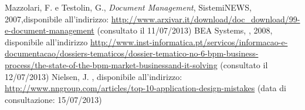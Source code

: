 \clearpage

\begin{thebibliography}{90}
   Mazzolari, F. e Testolin, G., \emph{Document Management}, SistemiNEWS, 2007,\newline disponibile all'indirizzo: \url{http://www.arxivar.it/download/doc_download/99-e-document-management} (consultato il 11/07/2013)
   BEA Systems, , 2008, \newline disponibile all'indirizzo \url{http://www.inst-informatica.pt/servicos/informacao-e-documentacao/dossiers-tematicos/dossier-tematico-no-6-bpm-business-process/the-state-of-the-bpm-market-businessand-it-solving} (consultato il 12/07/2013)
   Nielsen, J. , \newline disponibile all'indirizzo: \url{http://www.nngroup.com/articles/top-10-application-design-mistakes} (data di consultazione:  15/07/2013)
\end{thebibliography}


